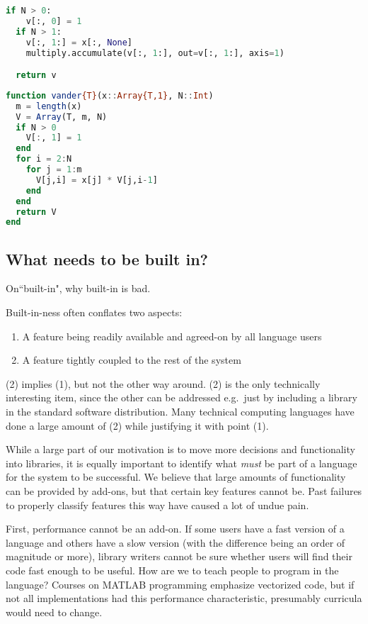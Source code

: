 {\begin{singlespace}
\begin{lstlisting}[language=python,style=ttcode]
  if N > 0:
    v[:, 0] = 1
  if N > 1:
    v[:, 1:] = x[:, None]
    multiply.accumulate(v[:, 1:], out=v[:, 1:], axis=1)

  return v
\end{lstlisting}
\end{singlespace}


\begin{singlespace}
\begin{lstlisting}[language=julia]
function vander{T}(x::Array{T,1}, N::Int)
  m = length(x)
  V = Array(T, m, N)
  if N > 0
    V[:, 1] = 1
  end
  for i = 2:N
    for j = 1:m
      V[j,i] = x[j] * V[j,i-1]
    end
  end
  return V
end
\end{lstlisting}
\end{singlespace}

\subsection{What needs to be built in?}

On``built-in", why built-in is bad.

Built-in-ness often conflates two aspects:

\begin{enumerate}
\item A feature being readily available and agreed-on by all language users
\item A feature tightly coupled to the rest of the system
\end{enumerate}

(2) implies (1), but not the other way around. (2) is the only technically
interesting item, since the other can be addressed e.g.\  just by including
a library in the standard software distribution. Many technical computing
languages have done a large amount of (2) while justifying it with point (1).


While a large part of our motivation is to move more decisions and functionality
into libraries, it is equally important to identify what {\it  must} be part of a
language for the system to be successful. We believe that large amounts of
functionality can be provided by add-ons, but that certain key features
cannot be. Past failures to properly classify features this way have
caused a lot of undue pain.

First, performance cannot be an add-on. If some users have a fast version of
a language and others have a slow version (with the difference being an
order of magnitude or more), library writers cannot be sure whether users
will find their code fast enough to be useful. How are we to teach people to
program in the language? Courses on MATLAB programming emphasize vectorized code,
but if not all implementations had this performance characteristic,
presumably curricula would need to change.

}
